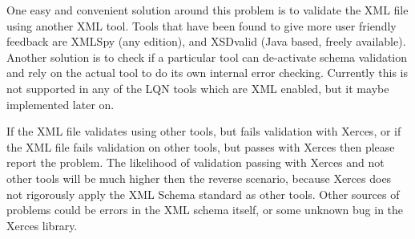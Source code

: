 One easy and convenient solution around this problem is to validate
the XML file using another XML tool.  Tools that
have been found to give more user friendly feedback are
XMLSpy (any edition), and XSDvalid (Java
based, freely available).  Another solution is to check if a
particular tool can de-activate schema validation and rely on the
actual tool to do its own internal error checking.  Currently this is
not supported in any of the LQN tools which are XML enabled, but it
maybe implemented later on.

If the XML file validates using other tools, but fails validation with
Xerces, or if the XML file fails validation on other tools, but passes
with Xerces then please report the problem.  The likelihood of
validation passing with Xerces and not other tools will be much higher
then the reverse scenario, because Xerces does not rigorously apply
the XML Schema standard as other tools.  Other sources of problems
could be errors in the XML schema itself, or some unknown bug in the
Xerces library.

